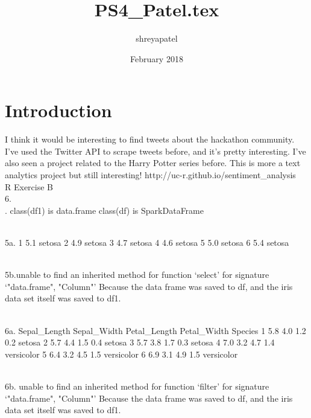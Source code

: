 \documentclass{article}
\title{PS4_Patel.tex}
\author{shreyapatel }
\date{February 2018}
\begin{document}
\maketitle

\section{Introduction}

I think it would be interesting to find tweets about the hackathon community. I've used the Twitter API to scrape tweets before, and it's pretty interesting. I've also seen a project related to the Harry Potter series before. This is more a text analytics project but still interesting! http://uc-r.github.io/sentiment_analysis\\


R Exercise B\\
6.\\
    . class(df1) is data.frame class(df) is SparkDataFrame

    \\
    \indent 5a. 1          5.1  setosa
2          4.9  setosa
3          4.7  setosa
4          4.6  setosa
5          5.0  setosa
6          5.4  setosa

    \\
    \indent 5b.unable to find an inherited method for function ‘select’ for signature ‘"data.frame", "Column"’ Because the data frame was saved to df, and the iris data set itself was saved to df1.

    \\
    \indent 6a.
    Sepal_Length Sepal_Width Petal_Length Petal_Width    Species
1          5.8         4.0          1.2         0.2     setosa
2          5.7         4.4          1.5         0.4     setosa
3          5.7         3.8          1.7         0.3     setosa
4          7.0         3.2          4.7         1.4 versicolor
5          6.4         3.2          4.5         1.5 versicolor
6          6.9         3.1          4.9         1.5 versicolor

    \\
    \indent 6b.  unable to find an inherited method for function ‘filter’ for signature ‘"data.frame", "Column"’ Because the data frame was saved to df, and the iris data set itself was saved to df1.

    \\
\end{document}
